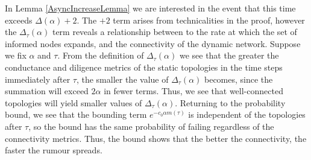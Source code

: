 In Lemma \ref{AsyncIncreaseLemma} we are interested in the event that this time exceeds $\Delta(\alpha) + 2$. 
The  $+2$ term arises from technicalities in the proof, however the $\Delta_\tau(\alpha)$ term reveals a relationship between to the rate at which the set of informed nodes expands, and the connectivity of the dynamic network.
Suppose we fix $\alpha$ and $\tau$. From the definition of $\Delta_\tau(\alpha)$ we see that the greater the conductance and diligence metrics of the static topologies in the time steps immediately after $\tau$, the smaller the value of $\Delta_\tau(\alpha)$ becomes, since the summation will exceed $2\alpha$ in fewer terms. Thus, we see that well-connected topologies will yield smaller values of $\Delta_\tau(\alpha)$. Returning to the probability bound, we see that the bounding term $e^{-c_0\alpha m(\tau)}$ is independent of the topologies after $\tau$, so the bound has the same probability of failing regardless of the connectivity metrics. Thus, the bound shows that the better the connectivity, the faster the rumour spreads.

